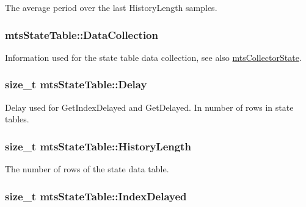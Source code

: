 The average period over the last History\-Length samples. \hypertarget{classmts_state_table_ae1da5c16bcb4faa19c35c2cfb1dee023}{
\subsubsection[{Data\-Collection}]{ mts\-State\-Table\-::\-Data\-Collection\hspace{0.3cm}{\ttfamily [protected]}}}\label{classmts_state_table_ae1da5c16bcb4faa19c35c2cfb1dee023}
Information used for the state table data collection, see also \hyperlink{classmts_collector_state}{mts\-Collector\-State}. \hypertarget{classmts_state_table_af676579bdc8d7e1a8616708a612dbed1}{
\subsubsection[{Delay}]{\setlength{\rightskip}{0pt plus 5cm}size\-\_\-t mts\-State\-Table\-::\-Delay\hspace{0.3cm}{\ttfamily [protected]}}}\label{classmts_state_table_af676579bdc8d7e1a8616708a612dbed1}
Delay used for Get\-Index\-Delayed and Get\-Delayed. In number of rows in state tables. \hypertarget{classmts_state_table_a922d394133217df6961407a890d21913}{
\subsubsection[{History\-Length}]{\setlength{\rightskip}{0pt plus 5cm}size\-\_\-t mts\-State\-Table\-::\-History\-Length\hspace{0.3cm}{\ttfamily [protected]}}}\label{classmts_state_table_a922d394133217df6961407a890d21913}
The number of rows of the state data table. \hypertarget{classmts_state_table_a21a94033326261d2aa69dec1e7000aea}{
\subsubsection[{Index\-Delayed}]{\setlength{\rightskip}{0pt plus 5cm}size\-\_\-t mts\-State\-Table\-::\-Index\-Delayed\hspace{0.3cm}{\ttfamily [protected]}}}\label{classmts_state_table_a21a94033326261d2aa69dec1e7000aea}
